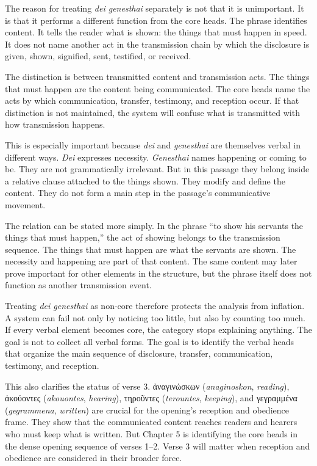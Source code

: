 The reason for treating \textit{dei genesthai} separately is not that it is unimportant. It is that it performs a different function from the core heads. The phrase identifies content. It tells the reader what is shown: the things that must happen in speed. It does not name another act in the transmission chain by which the disclosure is given, shown, signified, sent, testified, or received.

The distinction is between transmitted content and transmission acts. The things that must happen are the content being communicated. The core heads name the acts by which communication, transfer, testimony, and reception occur. If that distinction is not maintained, the system will confuse what is transmitted with how transmission happens.

This is especially important because \textit{dei} and \textit{genesthai} are themselves verbal in different ways. \textit{Dei} expresses necessity. \textit{Genesthai} names happening or coming to be. They are not grammatically irrelevant. But in this passage they belong inside a relative clause attached to the things shown. They modify and define the content. They do not form a main step in the passage's communicative movement.

The relation can be stated more simply. In the phrase ``to show his servants the things that must happen,'' the act of showing belongs to the transmission sequence. The things that must happen are what the servants are shown. The necessity and happening are part of that content. The same content may later prove important for other elements in the structure, but the phrase itself does not function as another transmission event.

Treating \textit{dei genesthai} as non-core therefore protects the analysis from inflation. A system can fail not only by noticing too little, but also by counting too much. If every verbal element becomes core, the category stops explaining anything. The goal is not to collect all verbal forms. The goal is to identify the verbal heads that organize the main sequence of disclosure, transfer, communication, testimony, and reception.

This also clarifies the status of verse 3. \textgreek{ἀναγινώσκων} (\textit{anaginoskon}, \textit{reading}), \textgreek{ἀκούοντες} (\textit{akouontes}, \textit{hearing}), \textgreek{τηροῦντες} (\textit{terountes}, \textit{keeping}), and \textgreek{γεγραμμένα} (\textit{gegrammena}, \textit{written}) are crucial for the opening's reception and obedience frame. They show that the communicated content reaches readers and hearers who must keep what is written. But Chapter 5 is identifying the core heads in the dense opening sequence of verses 1--2. Verse 3 will matter when reception and obedience are considered in their broader force.

